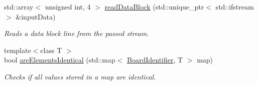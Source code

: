 \begin{DoxyCompactItemize}
std\+::array$<$ unsigned int, 4 $>$ \hyperlink{class_file_reader_ac578b683eba751027766a2c30f03a28b}{read\+Data\+Block} (std\+::unique\+\_\+ptr$<$ std\+::ifstream $>$ \&input\+Data)
\begin{DoxyCompactList}\small\item\em Reads a data block line from the passed stream. \end{DoxyCompactList}\item 
{\footnotesize template$<$class T $>$ }\\bool \hyperlink{class_file_reader_a7a4c0a8dd415c1e8914b169fde2591c0}{are\+Elements\+Identical} (std\+::map$<$ \hyperlink{class_board_identifier}{Board\+Identifier}, T $>$ map)
\begin{DoxyCompactList}\small\item\em Checks if all values stored in a map are identical. \end{DoxyCompactList}\end{DoxyCompactItemize}
